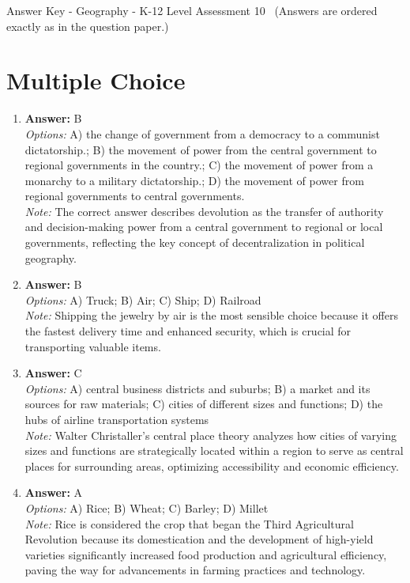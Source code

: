\documentclass[12pt]{article}
\begin{document}
\begin{center}
Answer Key - Geography - K-12 Level Assessment 10 \
\small (Answers are ordered exactly as in the question paper.)
\end{center}

\section*{Multiple Choice}
\begin{enumerate}[label=\arabic*.]
\item \textbf{Answer:} B
\\ \textit{Options:} A) the change of government from a democracy to a communist dictatorship.; B) the movement of power from the central government to regional governments in the country.; C) the movement of power from a monarchy to a military dictatorship.; D) the movement of power from regional governments to central governments.
\\ \textit{Note:} The correct answer describes devolution as the transfer of authority and decision-making power from a central government to regional or local governments, reflecting the key concept of decentralization in political geography.
\item \textbf{Answer:} B
\\ \textit{Options:} A) Truck; B) Air; C) Ship; D) Railroad
\\ \textit{Note:} Shipping the jewelry by air is the most sensible choice because it offers the fastest delivery time and enhanced security, which is crucial for transporting valuable items.
\item \textbf{Answer:} C
\\ \textit{Options:} A) central business districts and suburbs; B) a market and its sources for raw materials; C) cities of different sizes and functions; D) the hubs of airline transportation systems
\\ \textit{Note:} Walter Christaller's central place theory analyzes how cities of varying sizes and functions are strategically located within a region to serve as central places for surrounding areas, optimizing accessibility and economic efficiency.
\item \textbf{Answer:} A
\\ \textit{Options:} A) Rice; B) Wheat; C) Barley; D) Millet
\\ \textit{Note:} Rice is considered the crop that began the Third Agricultural Revolution because its domestication and the development of high-yield varieties significantly increased food production and agricultural efficiency, paving the way for advancements in farming practices and technology.

\end{enumerate}
\end{document}
